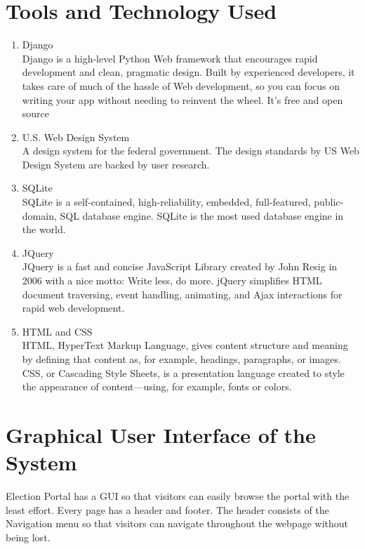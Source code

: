 \documentclass[12pt, a4paper, titlepage]{article}
\begin{document}
\section{Tools and Technology Used}
\begin{enumerate}
\item Django\\
Django is a high-level Python Web framework that encourages rapid development and clean, pragmatic design. Built by experienced developers, it takes care of much of the hassle of Web development, so you can focus on writing your app without needing to reinvent the wheel. It’s free and open source

\item 
U.S. Web Design System\\
A design system for the federal government. The design standards by US Web Design System are backed by user research.

\item SQLite\\
SQLite is a self-contained, high-reliability, embedded, full-featured, public-domain, SQL database engine. SQLite is the most used database engine in the world.

\item JQuery\\
JQuery is a fast and concise JavaScript Library created by John Resig in 2006 with a nice motto: Write less, do more. jQuery simplifies HTML document traversing, event handling, animating, and Ajax interactions for rapid web development.

\item HTML and CSS\\
HTML, HyperText Markup Language, gives content structure and meaning by defining that content as, for example, headings, paragraphs, or images. CSS, or Cascading Style Sheets, is a presentation language created to style the appearance of content—using, for example, fonts or colors.
\end{enumerate}
\newpage
    
\section{Graphical User Interface of the System}
Election Portal has a GUI so that visitors can easily browse the portal with the least effort. Every page has a header and footer. The header consists of the Navigation menu so that visitors can navigate throughout the webpage without being lost.
\end{document}
